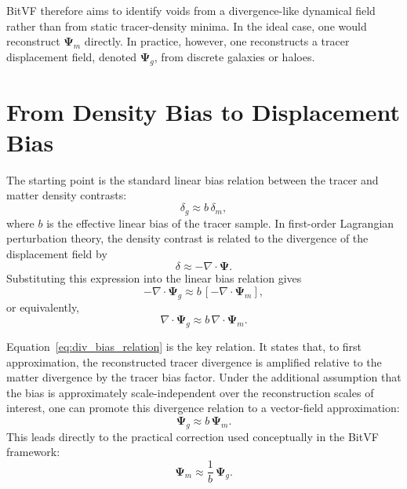 \documentclass[12pt]{report}
\begin{document}
BitVF therefore aims to identify voids from a divergence-like dynamical field rather than from static tracer-density minima. In the ideal case, one would reconstruct $\boldsymbol{\Psi}_m$ directly. In practice, however, one reconstructs a tracer displacement field, denoted $\boldsymbol{\Psi}_g$, from discrete galaxies or haloes.

\section{From Density Bias to Displacement Bias}

The starting point is the standard linear bias relation between the tracer and matter density contrasts:
\begin{equation}
    \delta_g \approx b\,\delta_m,
\end{equation}
where $b$ is the effective linear bias of the tracer sample. In first-order Lagrangian perturbation theory, the density contrast is related to the divergence of the displacement field by
\begin{equation}
    \delta \approx -\nabla \cdot \boldsymbol{\Psi}.
\end{equation}
Substituting this expression into the linear bias relation gives
\begin{equation}
    -\nabla \cdot \boldsymbol{\Psi}_g \approx b\,[-\nabla \cdot \boldsymbol{\Psi}_m],
\end{equation}
or equivalently,
\begin{equation}
    \nabla \cdot \boldsymbol{\Psi}_g \approx b\,\nabla \cdot \boldsymbol{\Psi}_m.
    \label{eq:div_bias_relation}
\end{equation}

Equation~\ref{eq:div_bias_relation} is the key relation. It states that, to first approximation, the reconstructed tracer divergence is amplified relative to the matter divergence by the tracer bias factor. Under the additional assumption that the bias is approximately scale-independent over the reconstruction scales of interest, one can promote this divergence relation to a vector-field approximation:
\begin{equation}
    \boldsymbol{\Psi}_g \approx b\,\boldsymbol{\Psi}_m.
\end{equation}
This leads directly to the practical correction used conceptually in the BitVF framework:
\begin{equation}
    \boldsymbol{\Psi}_m \approx \frac{1}{b}\,\boldsymbol{\Psi}_g.
    \label{eq:psi_bias_correction}
\end{equation}
\end{document}
